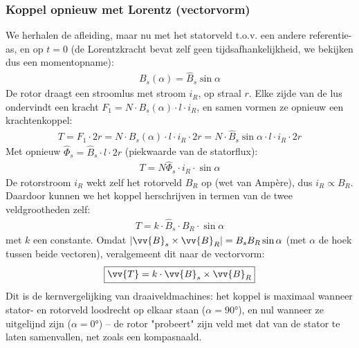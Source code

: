 \subsubsection{Koppel opnieuw met Lorentz (vectorvorm)}
We herhalen de afleiding, maar nu met het statorveld t.o.v.
een andere referentie-as, en op $t=0$ (de Lorentzkracht bevat zelf geen
tijdsafhankelijkheid, we bekijken dus een momentopname):
\begin{align*}
    B_s(\alpha) = \hat{B}_s \sin\alpha
\end{align*}
De rotor draagt een stroomlus met stroom $i_R$, op straal $r$.
Elke zijde van de lus ondervindt een kracht $F_1 = N \cdot B_s(\alpha) \cdot l \cdot i_R$,
en samen vormen ze opnieuw een krachtenkoppel:
\begin{align*}
    T = F_1 \cdot 2r = N \cdot B_s(\alpha) \cdot l \cdot i_R \cdot 2r = N \cdot \hat{B}_s \sin\alpha \cdot l \cdot i_R \cdot 2r
\end{align*}
Met opnieuw $\hat{\Phi}_s = \hat{B}_s \cdot l \cdot 2r$ (piekwaarde van de statorflux):
\begin{align*}
    T = N \hat{\Phi}_s \cdot i_R \cdot \sin\alpha
\end{align*}
De rotorstroom $i_R$ wekt zelf het rotorveld $B_R$ op (wet van Ampère), dus
$i_R \propto B_R$.
Daardoor kunnen we het koppel herschrijven in termen van de twee veldgrootheden zelf:
\begin{align*}
    T = k \cdot \hat{B}_s \cdot B_R \cdot \sin\alpha
\end{align*}
met $k$ een constante.
Omdat $|\vv{B}_s \times \vv{B}_R| = B_s B_R \sin\alpha$ (met $\alpha$ de hoek tussen beide
vectoren), veralgemeent dit naar de vectorvorm:
\begin{align*}
    \boxed{\vv{T} = k \cdot \vv{B}_s \times \vv{B}_R}
\end{align*}
Dit is de kernvergelijking van draaiveldmachines:
het koppel is maximaal wanneer stator- en rotorveld loodrecht op elkaar staan
($\alpha=90°$), en nul wanneer ze uitgelijnd zijn ($\alpha=0°$) -- de rotor "probeert"
zijn veld met dat van de stator te laten samenvallen, net zoals een kompasnaald.

\newpage
